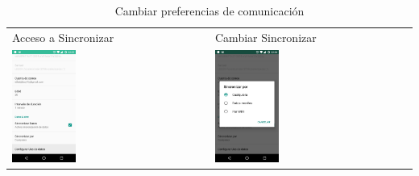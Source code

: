 {\begin{table}[!h]
\begin{tabular}{ll}
\textsf{\relax 
Acceso a Sincronizar
} & \textsf{\relax 
Cambiar Sincronizar
}\\
    {\includegraphics[width=0.33\textwidth]{anexos/graphics/conf_usage.jpg}}
 & 
    {\includegraphics[width=0.33\textwidth]{anexos/graphics/conf_sync.jpg}}
\\
\end{tabular}

\caption{Cambiar preferencias de comunicación}\label{config_adic:conn}
\end{table}

}
